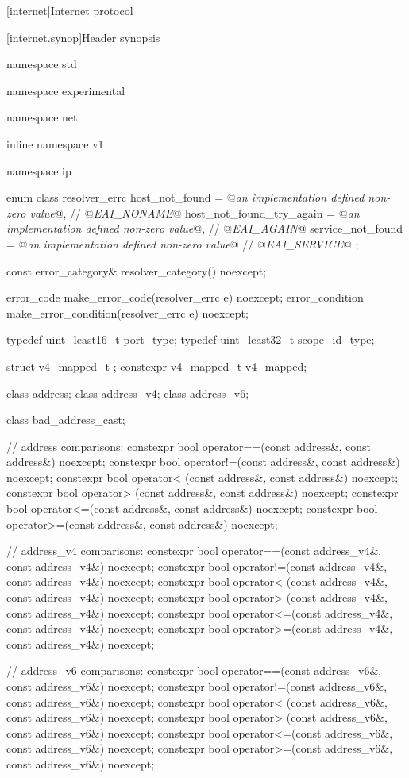 
[internet]{Internet protocol}


[internet.synop]{Header  synopsis}

\begin{codeblock}
namespace std {
namespace experimental {
namespace net {
inline namespace v1 {
namespace ip {

  enum class resolver_errc {
    host_not_found = @\textit{an implementation defined non-zero value}@, // @\textit{EAI_NONAME}@
    host_not_found_try_again = @\textit{an implementation defined non-zero value}@, // @\textit{EAI_AGAIN}@
    service_not_found = @\textit{an implementation defined non-zero value}@ // @\textit{EAI_SERVICE}@
  };

  const error_category& resolver_category() noexcept;

  error_code make_error_code(resolver_errc e) noexcept;
  error_condition make_error_condition(resolver_errc e) noexcept;

  typedef uint_least16_t port_type;
  typedef uint_least32_t scope_id_type;

  struct v4_mapped_t {};
  constexpr v4_mapped_t v4_mapped;

  class address;
  class address_v4;
  class address_v6;

  class bad_address_cast;

  // address comparisons:
  constexpr bool operator==(const address&, const address&) noexcept;
  constexpr bool operator!=(const address&, const address&) noexcept;
  constexpr bool operator< (const address&, const address&) noexcept;
  constexpr bool operator> (const address&, const address&) noexcept;
  constexpr bool operator<=(const address&, const address&) noexcept;
  constexpr bool operator>=(const address&, const address&) noexcept;

  // address_v4 comparisons:
  constexpr bool operator==(const address_v4&, const address_v4&) noexcept;
  constexpr bool operator!=(const address_v4&, const address_v4&) noexcept;
  constexpr bool operator< (const address_v4&, const address_v4&) noexcept;
  constexpr bool operator> (const address_v4&, const address_v4&) noexcept;
  constexpr bool operator<=(const address_v4&, const address_v4&) noexcept;
  constexpr bool operator>=(const address_v4&, const address_v4&) noexcept;

  // address_v6 comparisons:
  constexpr bool operator==(const address_v6&, const address_v6&) noexcept;
  constexpr bool operator!=(const address_v6&, const address_v6&) noexcept;
  constexpr bool operator< (const address_v6&, const address_v6&) noexcept;
  constexpr bool operator> (const address_v6&, const address_v6&) noexcept;
  constexpr bool operator<=(const address_v6&, const address_v6&) noexcept;
  constexpr bool operator>=(const address_v6&, const address_v6&) noexcept;

}}}}}
\end{codeblock}
